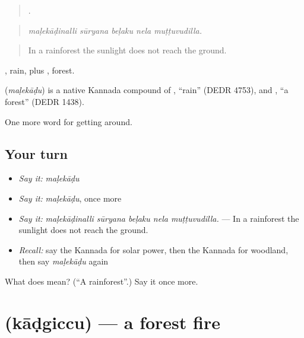 \begin{quote}
    .
\end{quote}

\begin{quote}
\emph{maḷekāḍinalli sūryana beḷaku nela muṭṭuvudilla.}
\end{quote}

\begin{quote}
In a rainforest the sunlight does not reach the ground.
\end{quote}

, rain, plus , forest.

\begin{cousinweb}
\textbf{} (\emph{maḷekāḍu}) is a native Kannada compound of , \textquotedblleft{}rain\textquotedblright{} (DEDR 4753), and , \textquotedblleft{}a forest\textquotedblright{} (DEDR 1438).
\end{cousinweb}

\begin{grammarlens}[title={What you've built}]
One more word for getting around.
\end{grammarlens}

\subsection*{Your turn}
\begin{itemize}
\raggedright
  \item \emph{Say it:} \emph{maḷekāḍu}
  \item \emph{Say it:} \emph{maḷekāḍu}, once more
  \item \emph{Say it:} \emph{maḷekāḍinalli sūryana beḷaku nela muṭṭuvudilla.} — In a rainforest the sunlight does not reach the ground.
  \item \emph{Recall:} say the Kannada for solar power, then the Kannada for woodland, then say \emph{maḷekāḍu} again
\end{itemize}

\begin{tcolorbox}[breakable,colback=teal!4,colframe=teal!35!black,title={Before you move on}]
What does  mean? (\textquotedblleft{}A rainforest\textquotedblright{}.) Say it once more.
\end{tcolorbox}
\section[\texorpdfstring{\kn{ಕಾಡ್ಗಿಚ್ಚು} (kāḍgiccu)}{ಕಾಡ್ಗಿಚ್ಚು (kāḍgiccu)}]{ (kāḍgiccu) — a forest fire}

